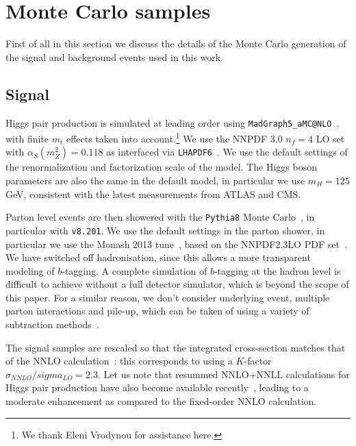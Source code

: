 \section{Monte Carlo samples}
\label{mcgeneration}

First of all in this section we discuss the details of the
Monte Carlo generation of the signal and background
events used in this work.

\subsection{Signal}

Higgs pair production is simulated at leading order using
{\tt MadGraph5\_aMC@NLO}~\cite{Alwall:2014hca}, with finite $m_t$ effects taken into
account.\footnote{We thank Eleni Vrodynou for assistance here.}
%
We use the NNPDF 3.0 $n_f = 4$ LO set~\cite{Ball:2014uwa} with
$\alpha_S(m_Z^2)=0.118$
as interfaced via {\tt LHAPDF6}~\cite{Buckley:2014ana}.
%
We use the default settings of the renormalization and factorization
scale of the model.
%
The Higgs boson parameters are also the same in the default model,
in particular we use $m_H=125$ GeV, consistent with the latest
measurements from ATLAS and CMS.

%
Parton level events are then showered with the {\tt Pythia8} Monte
Carlo~\cite{Sjostrand:2007gs,Sjostrand:2014zea}, in particular with {\tt v8.201}.
%
We use the default settings in the parton shower, in particular
we use the Monash 2013 tune~\cite{Skands:2014pea}, based on the NNPDF2.3LO PDF set~\cite{Ball:2012cx}.
%
We have switched off hadronisation, since this allows a more transparent modeling of
$b$-tagging.
%
A complete simulation of $b$-tagging at the hadron level is difficult to achieve without a full
detector simulator, which is beyond the scope of this paper.
%
For a similar reason, we don't consider underlying event, multiple parton interactions and
pile-up, which can be taken of using a variety of subtraction methods~\cite{Cacciari:2009dp}.


The signal samples are rescaled so that the integrated cross-section matches that of the
NNLO calculation~\cite{deFlorian:2013jea}: this corresponds to using a $K$-factor $\sigma_{NNLO}/sigma_{LO}=2.3$.
%
Let us note that resummed NNLO+NNLL calculations for Higgs pair production have also become available recently~\cite{deFlorian:2015moa},
leading to a moderate enhancement as compared to the fixed-order NNLO calculation.


